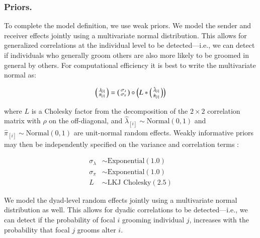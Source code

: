 \documentclass[Afour,sageh,times]{sagej}
\begin{document}
\subsubsection{Priors.}
To complete the model definition, we use weak priors. We model the sender and receiver effects jointly using a multivariate normal distribution. This allows for generalized correlations at the individual level to be detected---i.e., we can detect if individuals who generally groom others are also more likely to be groomed in general by others. For computational efficiency \citep{stan2021, lewandowski2009generating} it is best to write the multivariate normal as:
\begin{ceqn}
\begin{equation}
 \begin{psmallmatrix}
\lambda_{[i]} \\
\pi_{[i]}
\end{psmallmatrix}
 =  \begin{psmallmatrix}
\sigma_\lambda\\
\sigma_\pi
\end{psmallmatrix} \circ \left(L* \begin{psmallmatrix}
\hat\lambda_{[i]} \\
\hat\pi_{[i]}
\end{psmallmatrix}\right)
\end{equation}
\end{ceqn}
where $L$ is a Cholesky factor from the decomposition of the $2 \times 2$ correlation matrix with $\rho$ on the off-diagonal, and $\hat\lambda_{[i]}\sim \text {Normal}(0,1)$ and $\hat\pi_{[i]}\sim \text {Normal}(0,1)$ are unit-normal random effects. 
Weakly informative priors may then be independently specified on the variance and correlation terms \citep{lewandowski2009generating}:

\begin{ceqn}
\begin{align}
\sigma_\lambda &\sim \text {Exponential}(1.0)\label{bob69}\\
\sigma_\pi &\sim \text {Exponential}(1.0)\label{bob420}\\
L &\sim \text {LKJ Cholesky}(2.5)\label{bob420L}
\end{align}
\end{ceqn}

We model the dyad-level random effects jointly using a multivariate normal distribution as well. This allows for dyadic correlations to be detected---i.e., we can detect if the probability of focal $i$ grooming individual $j$, increases with the probability that focal $j$ grooms alter $i$.
\end{document}
